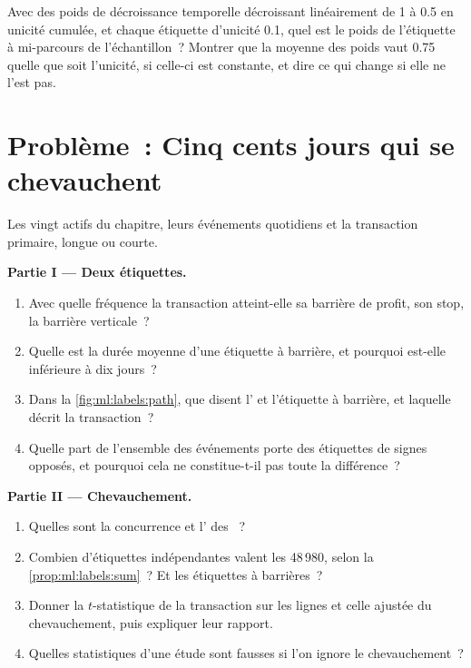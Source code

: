\begin{exercise}[$\star\star\star$]\label{exo:ml:targets-labels-and-sample-weights:8}
Avec des poids de décroissance temporelle décroissant linéairement de 1 à 0.5 en unicité cumulée, et chaque étiquette d'unicité 0.1, quel est le poids de l'étiquette
à mi-parcours de l'échantillon~? Montrer que la moyenne des poids vaut 0.75 quelle que soit l'unicité, si celle-ci
est constante, et dire ce qui change si elle ne l'est pas.
\end{exercise}

\section{Problème~: Cinq cents jours qui se chevauchent}

\begin{problem}\label{pb:ml:targets-labels-and-sample-weights:1}
Les vingt actifs du chapitre, leurs événements quotidiens et la transaction primaire, longue ou courte.

\medskip\noindent\textbf{Partie I --- Deux étiquettes.}
\begin{enumerate}
\item Avec quelle fréquence la transaction atteint-elle sa barrière de profit, son stop, la barrière verticale~?
\item Quelle est la durée moyenne d'une étiquette à barrière, et pourquoi est-elle inférieure à dix jours~?
\item Dans la \cref{fig:ml:labels:path}, que disent l' et l'étiquette à barrière, et laquelle décrit la transaction~?
\item Quelle part de l'ensemble des événements porte des étiquettes de signes opposés, et pourquoi cela ne constitue-t-il pas toute la différence~?
\end{enumerate}

\medskip\noindent\textbf{Partie II --- Chevauchement.}
\begin{enumerate}[resume]
\item Quelles sont la concurrence et l' des ~?
\item Combien d'étiquettes indépendantes valent les 48\,980, selon la \cref{prop:ml:labels:sum}~? Et les étiquettes à barrières~?
\item Donner la $t$-statistique de la transaction sur les lignes et celle ajustée du chevauchement, puis expliquer leur rapport.
\item Quelles statistiques d'une étude sont fausses si l'on ignore le chevauchement~?
\end{enumerate}


\end{problem}
